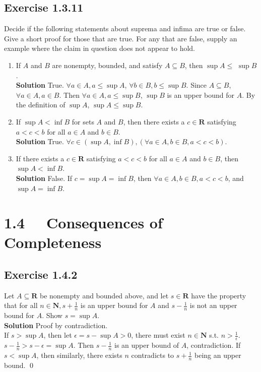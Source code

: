 \documentclass[12pt]{report}
\begin{document}
\subsection*{Exercise 1.3.11}
Decide if the following statements about suprema and infima are true or false. Give a short proof for those that are true. For any that are false, supply an example where the claim in question does not appear to hold.
\begin{enumerate}[label=(\alph*)]
    \item If $A$ and $B$ are nonempty, bounded, and satisfy $A \subseteq B$, then $\sup A \leq$ $\sup B$.\\
    \textbf{Solution} True. $\forall a \in A, a \leq \sup A$, $\forall b \in B, b \leq \sup B$. Since $A \subseteq B$, $\forall a \in A, a \in B$. Then $\forall a \in A, a \leq \sup B$, $\sup B$ is an upper bound for $A$. By the definition of $\sup A$, $\sup A \leq \sup B$.
    \item If $\sup A<\inf B$ for sets $A$ and $B$, then there exists a $c \in \mathbf{R}$ satisfying $a<c<b$ for all $a \in A$ and $b \in B$.\\
    \textbf{Solution} True. $\forall c \in (\sup A,\inf B), (\forall a \in A, b \in B, a<c<b)$. 
    \item If there exists a $c \in \mathbf{R}$ satisfying $a<c<b$ for all $a \in A$ and $b \in B$, then $\sup A<\inf B$.\\
    \textbf{Solution} False. If $c = \sup A =\inf B$, then $\forall a \in A, b \in B, a<c<b$, and $\sup A = \inf B$.
\end{enumerate}

\section{1.4 ~~Consequences of Completeness}
\subsection*{Exercise 1.4.2}
Let $A \subseteq \mathbf{R}$ be nonempty and bounded above, and let $s \in \mathbf{R}$ have the property that for all $n \in \mathbf{N}, s+\frac{1}{n}$ is an upper bound for $A$ and $s-\frac{1}{n}$ is not an upper bound for $A$. Show $s=\sup A$.\\
\textbf{Solution} Proof by contradiction.\\
If $s > \sup A$, then let $\epsilon = s-\sup A > 0$, there must exist $n \in \mathbf{N}$ s.t. $n > \frac{1}{\epsilon}$. $s-\frac{1}{n} > s- \epsilon = \sup A$. Then $s-\frac{1}{n}$ is an upper bound of $A$, contradiction.
If $s < \sup A$, then similarly, there exists $n$ contradicts to $s+\frac{1}{n}$ being an upper bound. \qed
\end{document}
